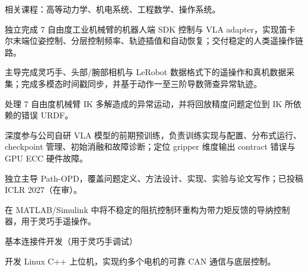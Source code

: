 \documentclass[10pt,a4paper]{article}
\begin{document}

\begin{cvitems}
  \item 相关课程：高等动力学、机电系统、工程数学、操作系统。
\end{cvitems}

\vspace{1.4pt}

\begin{cvitems}
  \item 独立完成 7 自由度工业机械臂的机器人端 SDK 控制与 VLA adapter，实现笛卡尔末端位姿控制、分层控制频率、轨迹插值和自动恢复；交付稳定的人类遥操作链路。
  \item 主导完成灵巧手、头部/腕部相机与 LeRobot 数据格式下的遥操作和真机数据采集；完成多模态时间戳同步，并基于动作一至三阶导数筛查异常轨迹。
  \item 处理 7 自由度机械臂 IK 多解造成的异常运动，并将回放精度问题定位到 IK 所依赖的错误 URDF。
  \item 深度参与公司自研 VLA 模型的前期预训练，负责训练实现与配置、分布式运行、checkpoint 管理、初始消融和故障诊断；定位 gripper 维度输出 contract 错误与 GPU ECC 硬件故障。
  \item 独立主导 Path-OPD，覆盖问题定义、方法设计、实现、实验与论文写作；已投稿 ICLR 2027（在审）。
\end{cvitems}

\begin{cvitems}
  \item 在 MATLAB/Simulink 中将不稳定的阻抗控制环重构为带力矩反馈的导纳控制器，用于灵巧手遥操作。
  \item 基本连接件开发（用于灵巧手调试）
  \item 开发 Linux C++ 上位机，实现约多个电机的可靠 CAN 通信与底层控制。
\end{cvitems}
\end{document}
